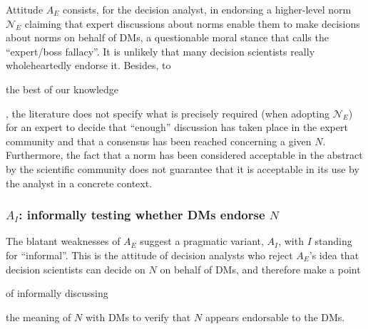 \documentclass[preprint, french, english, 11pt, authoryear]{elsarticle}%
\newcommand{\protectforpdf}[1]{\texorpdfstring{\ensuremath{#1}}{#1}}
\begin{document}

Attitude $A_E$ consists, for the decision analyst, in endorsing a higher-level norm $\mathscr{N}_E$ claiming that expert discussions about norms enable them to make decisions about norms on behalf of \acp{DM}, a questionable moral stance that \citet{estlund_democratic_2009} calls the ``expert/boss fallacy''. 
It is unlikely that many decision scientists really wholeheartedly endorse it. 
Besides, to \begin{changebar}the best of our knowledge\end{changebar}, the literature does not specify what is precisely required (when adopting  $\mathscr{N}_E$) for an expert to decide that “enough” discussion has taken place in the expert community and that a consensus has been reached concerning a given $N$. 
Furthermore, the fact that a norm has been considered acceptable in the abstract by the scientific community does not guarantee that it is acceptable in its use by the analyst in a concrete context.

\subsubsection{\texorpdfstring{$A_I$}{AI}: informally testing whether \aclp{DM} endorse \protectforpdf{N}}
The blatant weaknesses of $A_E$ suggest a pragmatic variant, $A_I$, with $I$ standing for “informal”. 
This is the attitude of decision analysts who reject $A_E$'s idea that decision scientists can decide on $N$ on behalf of \acp{DM}, and therefore make a point \begin{changebar}of informally discussing\end{changebar} the meaning of $N$ with \acp{DM} to verify that %
$N$ appears endorsable to the \acp{DM}.%
\end{document}
